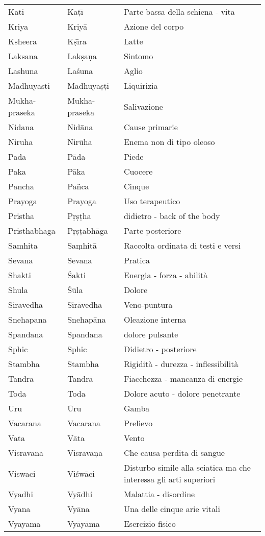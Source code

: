 \begin{longtable}{|p{3cm}|p{3cm}|p{10cm}|}
Kati & Ka\d{t}\={\i} & Parte bassa della schiena - vita \\
Kriya & Kriy\={a} & Azione del corpo \\
Ksheera & K\d{s}\={\i}ra & Latte \\
Laksana & Lak\d{s}a\d{n}a & Sintomo \\
Lashuna & La\'{s}una & Aglio \\
Madhuyasti & Madhuya\d{s}\d{t}i & Liquirizia \\
Mukha-praseka & Mukha-praseka & Salivazione \\
Nidana & Nid\={a}na & Cause primarie \\
Niruha & Nir\={u}ha & Enema non di tipo oleoso \\
Pada & P\={a}da & Piede \\
Paka & P\={a}ka & Cuocere \\
Pancha & Pa\~{n}ca & Cinque \\
Prayoga & Prayoga & Uso terapeutico \\
Pristha & P\d{r}\d{s}\d{t}ha & didietro - back of the body \\
Pristhabhaga & P\d{r}\d{s}\d{t}abh\={a}ga & Parte posteriore \\
Samhita & Sa\d{m}hit\={a} & Raccolta ordinata di testi e versi \\
Sevana & Sevana & Pratica \\
Shakti & \'{S}akti & Energia - forza - abilità \\
Shula & \'{S}\={u}la & Dolore \\
Siravedha & Sir\={a}vedha & Veno-puntura \\
Snehapana & Snehap\={a}na & Oleazione interna \\
Spandana & Spandana & dolore pulsante \\
Sphic & Sphic & Didietro - posteriore \\
Stambha & Stambha & Rigidità - durezza - inflessibilità \\
Tandra & Tandr\={a} & Fiacchezza - mancanza di energie \\
Toda & Toda & Dolore acuto - dolore penetrante \\
Uru & \={U}ru & Gamba \\
Vacarana & Vacarana & Prelievo \\
Vata & V\={a}ta & Vento \\
Visravana & Visr\={a}va\d{n}a & Che causa perdita di sangue \\
Viswaci & Vi\'{s}w\={a}ci & Disturbo simile alla sciatica ma che interessa gli arti superiori \\
Vyadhi & Vy\={a}dhi & Malattia - disordine \\
Vyana & Vy\={a}na & Una delle cinque arie vitali \\
Vyayama & Vy\={a}y\={a}ma & Esercizio fisico \\ \hline
   
\end{longtable}


